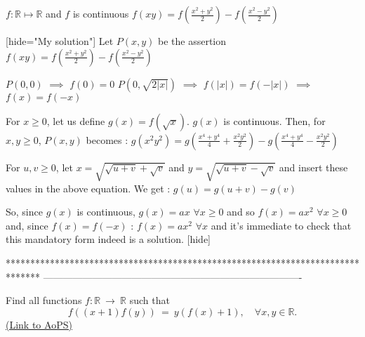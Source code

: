 \begin{solution}
	\begin{tcolorbox}$ f: \mathbb{R}\mapsto\mathbb{R}$ and $ f$ is continuous
$ f(xy) = f(\frac {x^{2} + y^{2}}{2}) - f(\frac {x^{2} - y^{2}}{2})$\end{tcolorbox}

[hide="My solution"]
Let $ P(x,y)$ be the assertion $ f(xy) = f(\frac {x^2 + y^2}2) - f(\frac {x^2 - y^2}2)$

$ P(0,0)$ $ \implies$ $ f(0) = 0$
$ P(0,\sqrt {2|x|})$ $ \implies$ $ f(|x|) = f( - |x|)$ $ \implies$ $ f(x) = f( - x)$

For $ x\geq 0$, let us define $ g(x) = f(\sqrt x)$. $ g(x)$ is continuous. Then, for $ x,y\geq 0$, $ P(x,y)$ becomes : $ g(x^2y^2) = g(\frac {x^4 + y^4}4 + \frac {x^2y^2}2) - g(\frac {x^4 + y^4}4 - \frac {x^2y^2}2)$

For $ u,v\geq 0$, let $ x = \sqrt {\sqrt {u + v} + \sqrt v}$ and $ y = \sqrt {\sqrt {u + v} - \sqrt v}$ and insert these values in the above equation. We get : $ g(u) = g(u + v) - g(v)$

So, since $ g(x)$ is continuous,  $ g(x) = ax$ $ \forall x\geq 0$ and so $ f(x) = ax^2$ $ \forall x\geq 0$ and, since $ f(x) = f( - x)$ : $ \boxed{f(x) = ax^2}$ $ \forall x$ and it's immediate to check that this mandatory form indeed is a solution.
[\/hide]
\end{solution}
*******************************************************************************
-------------------------------------------------------------------------------

\begin{problem}
	Find all functions $ f : \mathbb{R}  \ \to \ \mathbb{R}$ such that
\[f((x+1)f(y)) \ = \ y (f(x) +1) , \quad\forall x,y \in \mathbb{R}.\]
	\flushright \href{https://artofproblemsolving.com/community/c6h297003}{(Link to AoPS)}
\end{problem}



